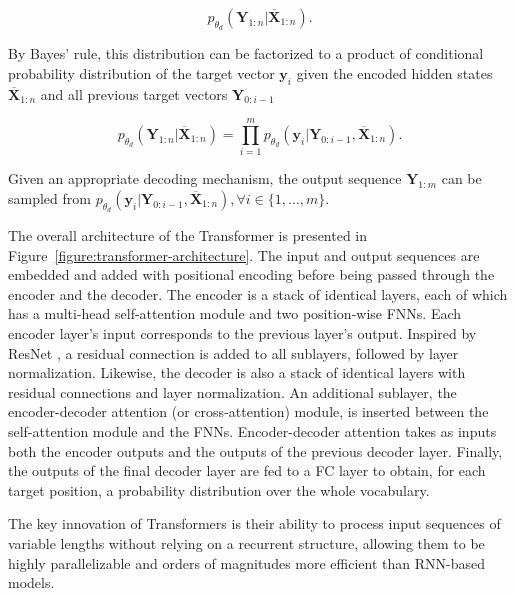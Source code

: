\begin{equation}
    p_{\theta_d}(\bm{{Y}}_{1:n} | \bm{\overline{X}}_{1:n}).
\end{equation}

By Bayes' rule, this distribution can be factorized to a product of conditional probability distribution of the target vector $\bm{y}_i$ given the encoded hidden states $\bm{\overline{X}}_{1:n}$ and all previous target vectors $\bm{Y}_{0:i-1}$

\begin{equation}
    p_{\theta_d}(\bm{Y}_{1:n} | \bm{\overline{X}}_{1:n}) = \prod_{i=1}^{m} p_{\theta_d}(\bm{y}_i | \bm{Y}_{0: i-1}, \bm{\overline{X}}_{1:n}).
\label{equation:transformer-conditional-prob-target-seq}
\end{equation}

Given an appropriate decoding mechanism, the output sequence $\bm{Y}_{1:m}$ can be sampled from $p_{\theta_d}\left(\bm{y}_i | \bm{Y}_{0: i-1}, \bm{\overline{X}}_{1:n}\right), \forall i \in \{1, \ldots, m\}$. \\


The overall architecture of the Transformer is presented in Figure~\ref{figure:transformer-architecture}. The input and output sequences are embedded and added with positional encoding before being passed through the encoder and the decoder. The encoder is a stack of identical layers, each of which has a multi-head self-attention module and two position-wise \acp{FNN}. Each encoder layer's input corresponds to the previous layer's output. Inspired by ResNet \citep{he2016deep}, a residual connection is added to all sublayers, followed by layer normalization. Likewise, the decoder is also a stack of identical layers with residual connections and layer normalization. An additional sublayer, the encoder-decoder attention (or cross-attention) module, is inserted between the self-attention module and the \acp{FNN}. Encoder-decoder attention takes as inputs both the encoder outputs and the outputs of the previous decoder layer. Finally, the outputs of the final decoder layer are fed to a \ac{FC} layer to obtain, for each target position, a probability distribution over the whole vocabulary.

The key innovation of Transformers is their ability to process input sequences of variable lengths without relying on a recurrent structure, allowing them to be highly parallelizable and orders of magnitudes more efficient than \ac{RNN}-based models. 

